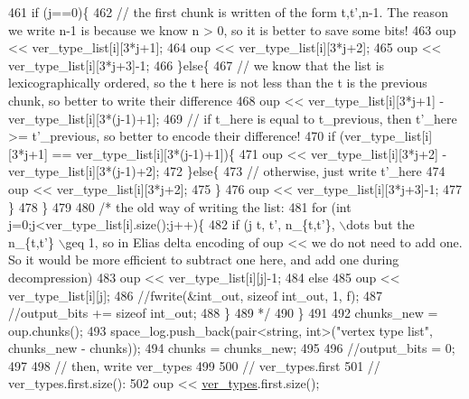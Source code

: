 \begin{DoxyCode}
461       \textcolor{keywordflow}{if} (j==0)\{
462         \textcolor{comment}{// the first chunk is written of the form t,t',n-1. The reason we write n-1 is because we know n >
       0, so it is better to save some bits!}
463         oup << ver\_type\_list[i][3*j+1];
464         oup << ver\_type\_list[i][3*j+2];
465         oup << ver\_type\_list[i][3*j+3]-1;
466       \}\textcolor{keywordflow}{else}\{
467         \textcolor{comment}{// we know that the list is lexicographically ordered, so the t here is not less than the t is the
       previous chunk, so better to write their difference}
468         oup << ver\_type\_list[i][3*j+1] - ver\_type\_list[i][3*(j-1)+1];
469         \textcolor{comment}{// if t\_here is equal to t\_previous, then t'\_here >= t'\_previous, so better to encode their
       difference!}
470         \textcolor{keywordflow}{if} (ver\_type\_list[i][3*j+1] == ver\_type\_list[i][3*(j-1)+1])\{
471           oup << ver\_type\_list[i][3*j+2] - ver\_type\_list[i][3*(j-1)+2];
472         \}\textcolor{keywordflow}{else}\{
473           \textcolor{comment}{// otherwise, just write t'\_here}
474           oup << ver\_type\_list[i][3*j+2];
475         \}
476         oup << ver\_type\_list[i][3*j+3]-1;
477       \}
478     \}
479 
480     \textcolor{comment}{/* the old way of writing the list:}
481 \textcolor{comment}{    for (int j=0;j<ver\_type\_list[i].size();j++)\{}
482 \textcolor{comment}{      if (j%
       t, t', n\_\{t,t'\}, \(\backslash\)dots but the n\_\{t,t'\} \(\backslash\)geq 1, so in Elias delta encoding of oup << we do not need to add
       one. So it would be more efficient to subtract one here, and add one during decompression)}
483 \textcolor{comment}{        oup << ver\_type\_list[i][j]-1;}
484 \textcolor{comment}{      else}
485 \textcolor{comment}{        oup << ver\_type\_list[i][j];}
486 \textcolor{comment}{      //fwrite(&int\_out, sizeof int\_out, 1, f);}
487 \textcolor{comment}{      //output\_bits += sizeof int\_out;}
488 \textcolor{comment}{    \}}
489 \textcolor{comment}{    */}
490   \}
491 
492   chunks\_new = oup.chunks();
493   space\_log.push\_back(pair<string, int>(\textcolor{stringliteral}{"vertex type list"}, chunks\_new - chunks));
494   chunks = chunks\_new;
495 
496   \textcolor{comment}{//output\_bits = 0;}
497   
498   \textcolor{comment}{// then, write ver\_types}
499 
500   \textcolor{comment}{// ver\_types.first}
501   \textcolor{comment}{// ver\_types.first.size():}
502   oup << \hyperlink{classmarked__graph__compressed_af446cc5e23c241a92b76642fd5ebc403}{ver\_types}.first.size();

\end{DoxyCode}

